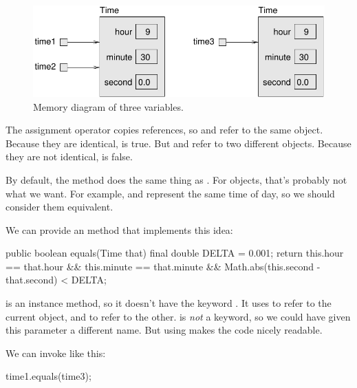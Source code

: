 
\begin{figure}[!ht]
\begin{center}
\includegraphics{figs/time2.pdf}
\caption{Memory diagram of three  variables.}
\label{fig.time2}
\end{center}
\end{figure}

The assignment operator copies references, so  and  refer to the same object.
Because they are identical,  is true.
But  and  refer to two different objects.
Because they are not identical,  is false.

By default, the  method does the same thing as \java{==}.
For  objects, that's probably not what we want.
For example,  and  represent the same time of day, so we should consider them equivalent.


We can provide an  method that implements this idea:

\begin{code}
public boolean equals(Time that) {
    final double DELTA = 0.001;
    return this.hour == that.hour
        && this.minute == that.minute
        && Math.abs(this.second - that.second) < DELTA;
}
\end{code}

 is an instance method, so it doesn't have the keyword .
It uses  to refer to the current object, and  to refer to the other.
 is {\em not} a keyword, so we could have given this parameter a different name.
But using  makes the code nicely readable.

We can invoke  like this:

\begin{code}
time1.equals(time3);
\end{code}

